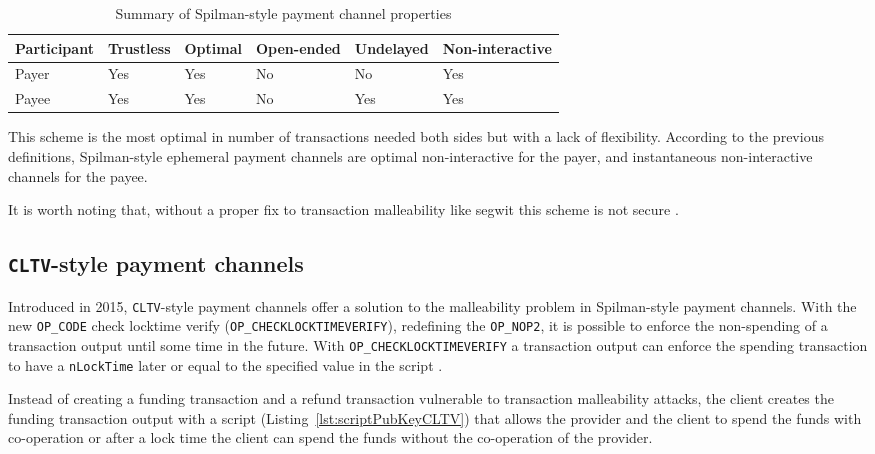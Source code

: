 \documentclass{llncs}
\begin{document}
\begin{table}[ht]
  \begin{tabularx}{\textwidth}{ | X | l | l | l | l | l |}
  \hline
  Participant & Trustless & Optimal & Open-ended & Undelayed & Non-interactive \\
  \hline \hline
  Payer & Yes & Yes & No & No & Yes \\ \hline
  Payee & Yes & Yes & No & Yes & Yes \\
  \hline
  \end{tabularx}
  \caption{Summary of Spilman-style payment channel properties}
  \label{fig:summarySpilmanPaymentChannel}
\end{table}

This scheme is the most optimal in number of transactions needed both sides but with a lack of flexibility. According to the previous definitions, Spilman-style ephemeral payment channels are optimal non-interactive for the payer, and instantaneous non-interactive channels for the payee.

It is worth noting that, without a proper fix to transaction malleability like \gls{segwit} this scheme is not secure \cite{SegWitBIP, BIP62, DBLP:journals/corr/AndrychowiczDMM13, DBLP:journals/corr/DeckerW14}.

\subsection{\texttt{CLTV}-style payment channels}

Introduced in 2015, \texttt{CLTV}-style payment channels offer a solution to the malleability problem in Spilman-style payment channels. With the new \texttt{OP\_CODE} check locktime verify (\texttt{OP\_CHECKLOCKTIMEVERIFY}), redefining the \texttt{OP\_NOP2}, it is possible to enforce the non-spending of a transaction output until some time in the future. With \texttt{OP\_CHECKLOCKTIMEVERIFY} a transaction output can enforce the spending transaction to have a \texttt{nLockTime} later or equal to the specified value in the script \cite{BIP65}.

Instead of creating a funding transaction and a refund transaction vulnerable to transaction malleability attacks, the client creates the funding transaction output with a script (Listing~\ref{lst:scriptPubKeyCLTV}) that allows the provider and the client to spend the funds with co-operation or after a lock time the client can spend the funds without the co-operation of the provider.

\end{document}
